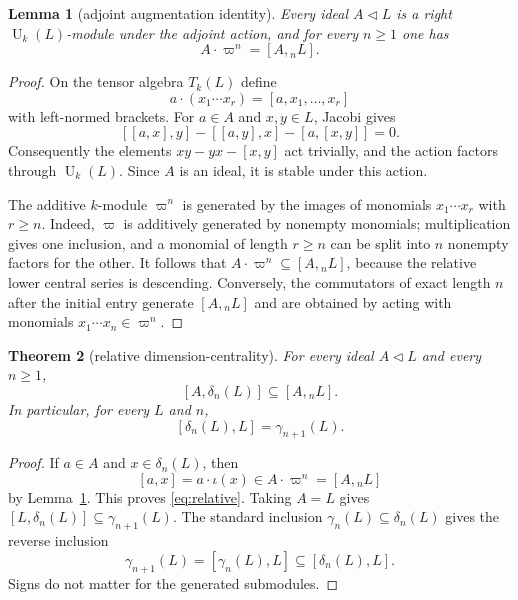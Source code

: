 \documentclass[a4paper,11pt,reqno]{amsart}
\newtheorem{theorem}{Theorem}[section]
\newtheorem{lemma}[theorem]{Lemma}
\theoremstyle{definition}
\theoremstyle{remark}
\newcommand{\U}{\operatorname U}
\newcommand{\aug}{\varpi}
\newcommand{\dlt}{\delta}
\newcommand{\gm}{\gamma}
\begin{document}
\begin{lemma}[adjoint augmentation identity]\label{lem:relative-module}
Every ideal $A\lhd L$ is a right $\U_k(L)$-module under the adjoint action,
and for every $n\geq1$ one has
\begin{equation}\label{eq:relative-module}
                    A\cdot\aug^n=[A,{}_nL].
\end{equation}
\end{lemma}

\begin{proof}
On the tensor algebra $T_k(L)$ define
\[
 a\cdot(x_1\cdots x_r)=[a,x_1,\ldots,x_r]
\]
with left-normed brackets.  For $a\in A$ and $x,y\in L$, Jacobi gives
\[
 [[a,x],y]-[[a,y],x]-[a,[x,y]]=0.
\]
Consequently the elements $xy-yx-[x,y]$ act trivially, and the action factors
through $\U_k(L)$.  Since $A$ is an ideal, it is stable under this action.

The additive $k$-module $\aug^n$ is generated by the images of monomials
$x_1\cdots x_r$ with $r\geq n$.  Indeed, $\aug$ is additively generated by
nonempty monomials; multiplication gives one inclusion, and a monomial of
length $r\geq n$ can be split into $n$ nonempty factors for the other.  It
follows that $A\cdot\aug^n\subseteq[A,{}_nL]$, because the relative lower
central series is descending.  Conversely, the commutators of exact length
$n$ after the initial entry generate $[A,{}_nL]$ and are obtained by acting
with monomials $x_1\cdots x_n\in\aug^n$.
\end{proof}

\begin{theorem}[relative dimension-centrality]\label{thm:relative}
For every ideal $A\lhd L$ and every $n\geq1$,
\begin{equation}\label{eq:relative}
                   [A,\dlt_n(L)]\subseteq[A,{}_nL].
\end{equation}
In particular, for every $L$ and $n$,
\begin{equation}\label{eq:main-centrality}
                   [\dlt_n(L),L]=\gm_{n+1}(L).
\end{equation}
\end{theorem}

\begin{proof}
If $a\in A$ and $x\in\dlt_n(L)$, then
\[
 [a,x]=a\cdot\iota(x)\in A\cdot\aug^n=[A,{}_nL]
\]
by Lemma~\ref{lem:relative-module}.  This proves \eqref{eq:relative}.
Taking $A=L$ gives
$[L,\dlt_n(L)]\subseteq\gm_{n+1}(L)$.  The standard inclusion
$\gm_n(L)\subseteq\dlt_n(L)$ gives the reverse inclusion
\[
 \gm_{n+1}(L)=[\gm_n(L),L]
              \subseteq[\dlt_n(L),L].
\]
Signs do not matter for the generated submodules.
\end{proof}
\end{document}
